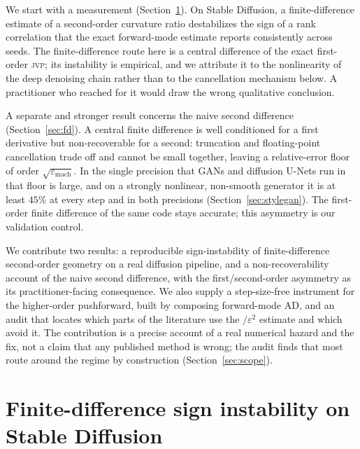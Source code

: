 \documentclass[10pt]{article} %
\newcommand{\jvp}{\textsc{jvp}}
\newcommand{\eps}{\varepsilon}
\begin{document}
We start with a measurement (Section~\ref{sec:flip}). On Stable Diffusion, a
finite-difference estimate of a second-order curvature ratio destabilizes the sign
of a rank correlation that the exact forward-mode estimate reports consistently
across seeds. The finite-difference route here is a central difference of the exact
first-order \jvp; its instability is empirical, and we attribute it to the
nonlinearity of the deep denoising chain rather than to the cancellation mechanism
below. A practitioner who reached for it would draw the wrong qualitative
conclusion.

A separate and stronger result concerns the naive second difference
(Section~\ref{sec:fd}). A central finite difference is well conditioned for a first
derivative but non-recoverable for a second: truncation and floating-point
cancellation trade off and cannot be small together, leaving a relative-error floor
of order $\sqrt{\eps_{\mathrm{mach}}}$. In the single precision that GANs and
diffusion U-Nets run in that floor is large, and on a strongly nonlinear, non-smooth
generator it is at least $45\%$ at every step and in both precisions
(Section~\ref{sec:stylegan}). The first-order finite difference of the same code
stays accurate; this asymmetry is our validation control.

We contribute two results: a reproducible sign-instability of finite-difference
second-order geometry on a real diffusion pipeline, and a non-recoverability
account of the naive second difference, with the first/second-order asymmetry as
its practitioner-facing consequence. We also supply a step-size-free instrument
for the higher-order pushforward, built by composing forward-mode AD, and an audit
that locates which parts of the literature use the $/\eps^2$ estimate and which
avoid it. The
contribution is a precise account of a real numerical hazard and the fix, not a
claim that any published method is wrong; the audit finds that most route around
the regime by construction (Section~\ref{sec:scope}).

\section{Finite-difference sign instability on Stable Diffusion}
\label{sec:flip}
\end{document}
